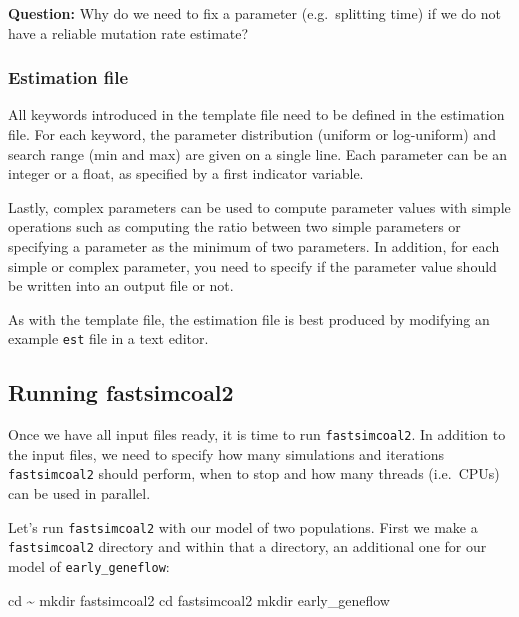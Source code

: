 \documentclass[
  letterpaper,
  DIV=11,
  numbers=noendperiod]{scrartcl}
\newenvironment{Shaded}{\begin{snugshade}}{\end{snugshade}}
\newcommand{\NormalTok}[1]{\textcolor[rgb]{0.00,0.23,0.31}{#1}}
\begin{document}
\textbf{Question:} Why do we need to fix a parameter (e.g.~splitting
time) if we do not have a reliable mutation rate estimate?

\hypertarget{estimation-file}{%
\subsubsection{Estimation file}\label{estimation-file}}

All keywords introduced in the template file need to be defined in the
estimation file. For each keyword, the parameter distribution (uniform
or log-uniform) and search range (min and max) are given on a single
line. Each parameter can be an integer or a float, as specified by a
first indicator variable.

Lastly, complex parameters can be used to compute parameter values with
simple operations such as computing the ratio between two simple
parameters or specifying a parameter as the minimum of two parameters.
In addition, for each simple or complex parameter, you need to specify
if the parameter value should be written into an output file or not.

As with the template file, the estimation file is best produced by
modifying an example \texttt{est} file in a text editor.

\hypertarget{running-fastsimcoal2}{%
\subsection{Running fastsimcoal2}\label{running-fastsimcoal2}}

Once we have all input files ready, it is time to run
\texttt{fastsimcoal2}. In addition to the input files, we need to
specify how many simulations and iterations \texttt{fastsimcoal2} should
perform, when to stop and how many threads (i.e.~CPUs) can be used in
parallel.

Let's run \texttt{fastsimcoal2} with our model of two populations. First
we make a \texttt{fastsimcoal2} directory and within that a directory,
an additional one for our model of \texttt{early\_geneflow}:

\begin{Shaded}
\begin{Highlighting}[]
\NormalTok{cd \textasciitilde{}}
\NormalTok{mkdir fastsimcoal2}
\NormalTok{cd fastsimcoal2}
\NormalTok{mkdir early\_geneflow}
\end{Highlighting}
\end{Shaded}
\end{document}
